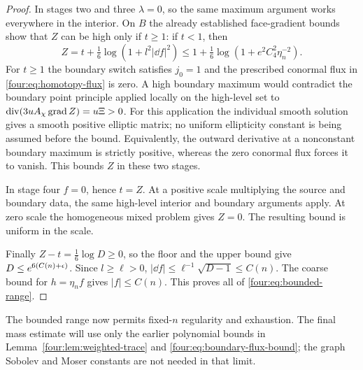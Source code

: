 \begin{proof}
In stages two and three $\lambda=0$, so the same maximum argument
works everywhere in the interior.  On $B$ the already established
face-gradient bounds show that $Z$ can be high only if $t\ge1$:
if $t<1$, then
\[
 Z=t+\tfrac16\log(1+l^2|\dd f|^2)
 \le1+\tfrac16\log(1+e^2C_4^2\eta_n^{-2}).
\]
For $t\ge1$ the boundary switch satisfies $j_0=1$ and the
prescribed conormal flux in \eqref{four:eq:homotopy-flux} is zero.
A high boundary maximum would contradict the boundary point
principle applied locally on the high-level set to
$\operatorname{div}(3uA_\chi\operatorname{grad} Z)=u\Xi>0$.
For this application the individual smooth solution gives a
smooth positive elliptic matrix; no uniform ellipticity constant
is being assumed before the bound.  Equivalently, the outward
derivative at a nonconstant boundary maximum is strictly positive,
whereas the zero conormal flux forces it to vanish.  This bounds
$Z$ in these two stages.

In stage four $f=0$, hence $t=Z$.  At a positive scale multiplying
the source and boundary data, the same high-level interior and
boundary arguments apply.  At zero scale the homogeneous mixed
problem gives $Z=0$.  The resulting bound is uniform in the scale.

Finally $Z-t=\frac16\log D\ge0$, so the floor and the upper bound
give $D\le e^{6(C(n)+\epsilon)}$.  Since $l\ge\ell>0$,
$|\dd f|\le\ell^{-1}\sqrt{D-1}\le C(n)$.
The coarse bound for $h=\eta_nf$ gives $|f|\le C(n)$.
This proves all of \eqref{four:eq:bounded-range}.
\end{proof}

The bounded range now permits fixed-$n$ regularity and exhaustion.
The final mass estimate will use only the earlier polynomial bounds
in Lemma~\ref{four:lem:weighted-trace} and
\eqref{four:eq:boundary-flux-bound}; the graph Sobolev and Moser constants
are not needed in that limit.

